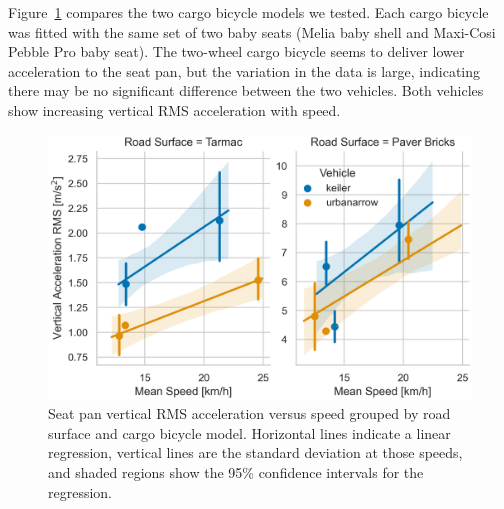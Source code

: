 \documentclass[a4paper]{article}
\begin{document}
Figure~\ref{fig:bicycle-type-compare} compares the two cargo bicycle models we
tested. Each cargo bicycle was fitted with the same set of two baby seats (Melia
baby shell and Maxi-Cosi Pebble Pro baby seat). The two-wheel cargo bicycle
seems to deliver lower acceleration to the seat pan, but the variation in the
data is large, indicating there may be no significant difference between the two
vehicles. Both vehicles show increasing vertical RMS acceleration with speed.
%
\begin{figure}
  \centering
  \includegraphics[width=160mm]{fig/SeatBotacc_ver-bicycle-type-compare.png}
  \caption{Seat pan vertical RMS acceleration versus speed grouped by road
  surface and cargo bicycle model. Horizontal lines indicate a linear
  regression, vertical lines are the standard deviation at those speeds, and
  shaded regions show the 95\% confidence intervals for the regression.}
  \label{fig:bicycle-type-compare}
\end{figure}
\end{document}
